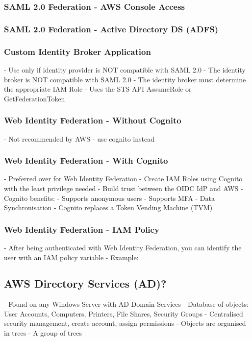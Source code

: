 \documentclass[11pt]{book}
\begin{document}
    \subsubsection{SAML 2.0 Federation - AWS Console Access}

    \subsubsection{SAML 2.0 Federation - Active Directory DS (ADFS)}

    \subsubsection{Custom Identity Broker Application}
    - Use only if identity provider is NOT compatible with SAML 2.0
    - The identity broker is NOT compatible with SAML 2.0
    - The identity broker must determine the appropriate IAM Role
    - Uses the STS API AssumeRole or GetFederationToken

    \subsubsection{Web Identity Federation - Without Cognito}
    - Not recommended by AWS - use cognito instead

    \subsubsection{Web Identity Federation - With Cognito}
    - Preferred over for Web Identity Federation
    - Create IAM Roles using Cognito with the least privilege needed
    - Build trust between the OIDC IdP and AWS
    - Cognito benefits:
    - Supports anonymous users
    - Supports MFA
    - Data Synchronisation
    - Cognito replaces a Token Vending Machine (TVM)

    \subsubsection{Web Identity Federation - IAM Policy}
    - After being authenticated with Web Identity Federation, you can identify the user with an IAM policy variable
    - Example:

    \subsection{AWS Directory Services (AD)?}
    - Found on any Windows Server with AD Domain Services
    - Database of objects: User Accounts, Computers, Printers, File Shares, Security Groups
    - Centralised security management, create account, assign permissions
    - Objects are organised in trees
    - A group of trees
\end{document}

